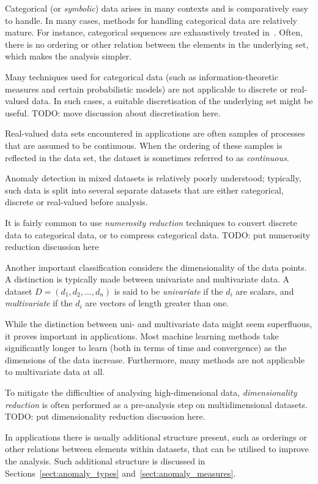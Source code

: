 Categorical (or \emph{symbolic}) data arises in many contexts and is comparatively easy to handle. In many cases, methods for handling categorical data are relatively mature. For instance, categorical sequences are exhaustively treated in~\cite{TODO}. Often, there is no ordering or other relation between the elements in the underlying set, which makes the analysis simpler.

Many techniques used for categorical data (such as information-theoretic measures and certain probabilistic models) are not applicable to discrete or real-valued data. In such cases, a suitable discretisation of the underlying set might be useful. TODO: move discussion about discretisation here.

Real-valued data sets encountered in applications are often samples of processes that are assumed to be continuous. When the ordering of these samples is reflected in the data set, the dataset is sometimes referred to as \emph{continuous}.

Anomaly detection in mixed datasets is relatively poorly understood; typically, such data is split into several separate datasets that are either categorical, discrete or real-valued before analysis.

It is fairly common to use \emph{numerosity reduction} techniques to convert discrete data to categorical data, or to compress categorical data. TODO: put numerosity reduction discussion here

Another important classification considers the dimensionality of the data points. A distinction is typically made between univariate and multivariate data. A dataset $D = (d_1, d_2, \dots, d_n)$ is said to be \emph{univariate} if the $d_i$ are scalars, and \emph{multivariate} if the $d_i$ are vectors of length greater than one.

While the distinction between uni- and multivariate data might seem superfluous, it proves important in applications. Most machine learning methods take significantly longer to learn (both in terms of time and convergence) as the dimensions of the data increase. Furthermore, many methods are not applicable to multivariate data at all.

To mitigate the difficulties of analysing high-dimensional data, \emph{dimensionality reduction} is often performed as a pre-analysis step on multidimensional datasets. TODO: put dimensionality reduction discussion here.

In applications there is usually additional structure present, such as orderings or other relations between elements within datasets, that can be utilised to improve the analysis. Such additional structure is discussed in Sections~\ref{sect:anomaly_types} and~\ref{sect:anomaly_measures}.

